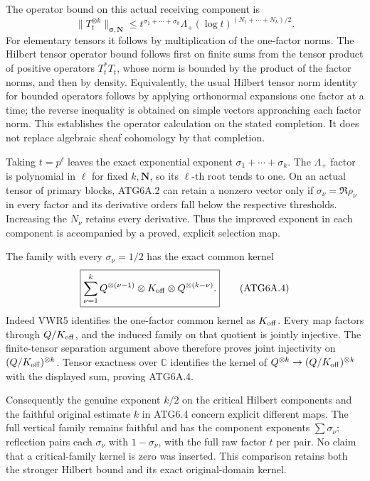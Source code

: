 The operator bound on this actual receiving component is \[
\boxed{\|T_t^{\otimes k}\|_{\boldsymbol\sigma,\boldsymbol N}
 \le t^{\sigma_1+\cdots+\sigma_k}
 \Lambda_+(\log t)^{(N_1+\cdots+N_k)/2}.}
\tag{ATG6A.3}
\] For elementary tensors it follows by multiplication of the one-factor
norms. The Hilbert tensor operator bound follows first on finite sums
from the tensor product of positive operators \(T_t^*T_t\), whose norm
is bounded by the product of the factor norms, and then by density.
Equivalently, the usual Hilbert tensor norm identity for bounded
operators follows by applying orthonormal expansions one factor at a
time; the reverse inequality is obtained on simple vectors approaching
each factor norm. This establishes the operator calculation on the
stated completion. It does not replace algebraic sheaf cohomology by
that completion.

Taking \(t=p^\ell\) leaves the exact exponential exponent
\(\sigma_1+\cdots+\sigma_k\). The \(\Lambda_+\) factor is polynomial in
\(\ell\) for fixed \(k,\boldsymbol N\), so its \(\ell\)-th root tends to
one. On an actual tensor of primary blocks, ATG6A.2 can retain a nonzero
vector only if \(\sigma_\nu=\Re\rho_\nu\) in every factor and its
derivative orders fall below the respective thresholds. Increasing the
\(N_\nu\) retains every derivative. Thus the improved exponent in each
component is accompanied by a proved, explicit selection map.

The family with every \(\sigma_\nu=1/2\) has the exact common kernel \[
\boxed{
\sum_{\nu=1}^k
 Q^{\otimes(\nu-1)}\otimes K_{\rm off}
 \otimes Q^{\otimes(k-\nu)}.}
\tag{ATG6A.4}
\] Indeed VWR5 identifies the one-factor common kernel as
\(K_{\rm off}\). Every map factors through \(Q/K_{\rm off}\), and the
induced family on that quotient is jointly injective. The finite-tensor
separation argument above therefore proves joint injectivity on
\((Q/K_{\rm off})^{\otimes k}\). Tensor exactness over \(\mathbb C\)
identifies the kernel of \(Q^{\otimes k}\to(Q/K_{\rm off})^{\otimes k}\)
with the displayed sum, proving ATG6A.4.

Consequently the genuine exponent \(k/2\) on the critical Hilbert
components and the faithful original estimate \(k\) in ATG6.4 concern
explicit different maps. The full vertical family remains faithful and
has the component exponents \(\sum\sigma_\nu\); reflection pairs each
\(\sigma_\nu\) with \(1-\sigma_\nu\), with the full raw factor \(t\) per
pair. No claim that a critical-family kernel is zero was inserted. This
comparison retains both the stronger Hilbert bound and its exact
original-domain kernel.

